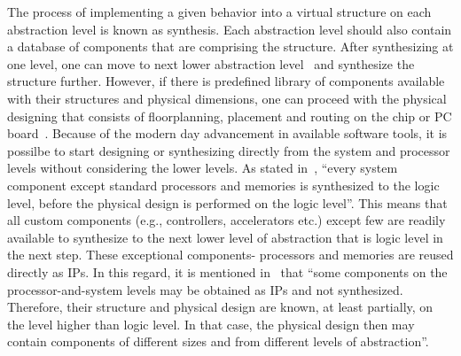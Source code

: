 The process of implementing a given behavior into a virtual structure on each abstraction level is known as synthesis. Each abstraction level should also contain a database of components that are comprising the structure. After synthesizing at one level, one can move to next lower abstraction level~\cite{Gajski.2009} and synthesize the structure further. However, if there is predefined library of components available with their structures and physical dimensions, one can proceed with the physical designing that consists of floorplanning, placement and routing on the chip or PC board~\cite{Gajski.2009}. Because of the modern day advancement in available software tools, it is possilbe to start designing or synthesizing directly from the system and processor levels without considering the lower levels. As stated in~\cite{Gajski.2009}, ``every system component except standard processors and memories is synthesized to the logic level, before the physical design is performed on the logic level''. This means that all custom components (e.g., controllers, accelerators etc.) except few are readily available to synthesize to the next lower level of abstraction that is logic level in the next step. These exceptional components- processors and memories are reused directly as IPs. In this regard, it is mentioned in~\cite{Gajski.2009} that ``some components on the processor-and-system levels may be obtained as IPs and not synthesized. Therefore, their structure and physical design are known, at least partially, on the level higher than logic level. In that case, the physical design then may contain components of different sizes and from different levels of abstraction''.

